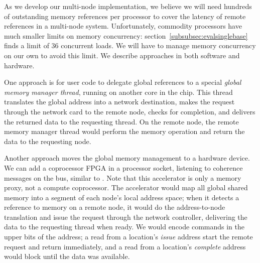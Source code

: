 \documentclass[10pt,nocopyrightspace]{sigplanconf}
\begin{document}
As we develop our multi-node implementation, we believe we will need hundreds of outstanding memory references per
processor to cover the latency of remote references in a multi-node
system. Unfortunately, commodity processors have much smaller limits
on memory concurrency: section~\ref{subsubsec:evalsinglebase} finds a
limit of 36 concurrent loads. We will have to manage memory
concurrency on our own to avoid this limit. We describe approaches in
both software and hardware.

One approach is for user code to delegate global references to a
special {\em global memory manager thread}, running on another core in
the chip. This thread translates the global address into a network
destination, makes the request through the network card to the remote
node, checks for completion, and delivers the returned data to the
requesting thread. On the remote node, the remote memory manager
thread would perform the memory operation and return the data to the
requesting node.


Another approach moves the global memory management to a hardware
device. We can add a coprocessor FPGA in a processor socket, listening
to coherence messages on the bus, similar to \cite{mogill}. Note that
this accelerator is only a memory proxy, not a compute
coprocessor. The accelerator would map all global shared memory into a
segment of each node's local address space; when it detects a
reference to memory on a remote node, it would do the address-to-node
translation and issue the request through the network controller,
delivering the data to the requesting thread when ready. We would
encode commands in the upper bits of the address; a read from a
location's {\em issue} address start the remote request and return
immediately, and a read from a location's {\em complete} address would
block until the data was available.


\end{document}
